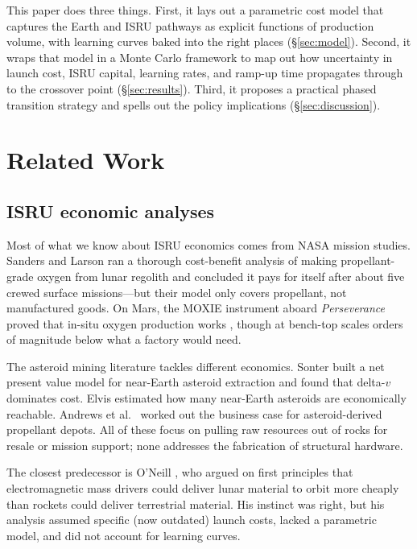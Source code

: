 \documentclass[preprint,12pt]{elsarticle}
\begin{document}
This paper does three things. First, it lays out a parametric cost model that captures the Earth and ISRU pathways as explicit functions of production volume, with learning curves baked into the right places (\S\ref{sec:model}). Second, it wraps that model in a Monte Carlo framework to map out how uncertainty in launch cost, ISRU capital, learning rates, and ramp-up time propagates through to the crossover point (\S\ref{sec:results}). Third, it proposes a practical phased transition strategy and spells out the policy implications (\S\ref{sec:discussion}).

\section{Related Work}
\label{sec:related}

\subsection{ISRU economic analyses}

Most of what we know about ISRU economics comes from NASA mission studies. Sanders and Larson \cite{sanders2015} ran a thorough cost-benefit analysis of making propellant-grade oxygen from lunar regolith and concluded it pays for itself after about five crewed surface missions---but their model only covers propellant, not manufactured goods. On Mars, the MOXIE instrument aboard \textit{Perseverance} proved that in-situ oxygen production works \cite{hecht2021}, though at bench-top scales orders of magnitude below what a factory would need.

The asteroid mining literature tackles different economics. Sonter \cite{sonter1997} built a net present value model for near-Earth asteroid extraction and found that delta-$v$ dominates cost. Elvis \cite{elvis2012} estimated how many near-Earth asteroids are economically reachable. Andrews et al.\ \cite{andrews2015} worked out the business case for asteroid-derived propellant depots. All of these focus on pulling raw resources out of rocks for resale or mission support; none addresses the fabrication of structural hardware.

The closest predecessor is O'Neill \cite{oneill1977}, who argued on first principles that electromagnetic mass drivers could deliver lunar material to orbit more cheaply than rockets could deliver terrestrial material. His instinct was right, but his analysis assumed specific (now outdated) launch costs, lacked a parametric model, and did not account for learning curves.
\end{document}
